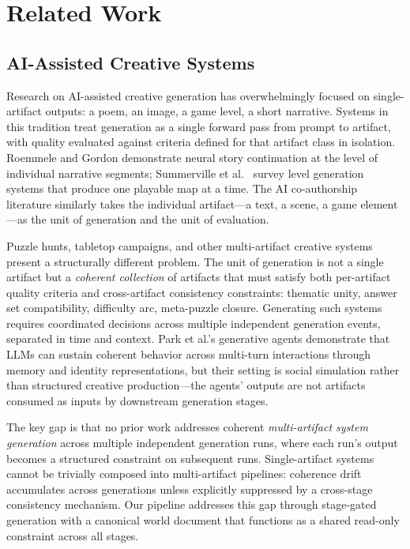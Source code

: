 \section{Related Work}
\label{sec:related}

\subsection{AI-Assisted Creative Systems}

Research on AI-assisted creative generation has overwhelmingly focused on single-artifact
outputs: a poem, an image, a game level, a short narrative. Systems in this tradition treat
generation as a single forward pass from prompt to artifact, with quality evaluated against
criteria defined for that artifact class in isolation. Roemmele and Gordon
\cite{roemmele2015} demonstrate neural story continuation at the level of individual
narrative segments; Summerville et al.\ \cite{summerville2018} survey level generation
systems that produce one playable map at a time. The AI co-authorship literature
\cite{kreminski2020} similarly takes the individual artifact---a text, a scene, a game
element---as the unit of generation and the unit of evaluation.

Puzzle hunts, tabletop campaigns, and other multi-artifact creative systems present a
structurally different problem. The unit of generation is not a single artifact but a
\emph{coherent collection} of artifacts that must satisfy both per-artifact quality criteria
and cross-artifact consistency constraints: thematic unity, answer set compatibility,
difficulty arc, meta-puzzle closure. Generating such systems requires coordinated decisions
across multiple independent generation events, separated in time and context. Park et al.'s
generative agents \cite{park2023generative} demonstrate that LLMs can sustain coherent
behavior across multi-turn interactions through memory and identity representations, but
their setting is social simulation rather than structured creative production---the agents'
outputs are not artifacts consumed as inputs by downstream generation stages.

The key gap is that no prior work addresses coherent \emph{multi-artifact system generation}
across multiple independent generation runs, where each run's output becomes a structured
constraint on subsequent runs. Single-artifact systems cannot be trivially composed into
multi-artifact pipelines: coherence drift accumulates across generations unless explicitly
suppressed by a cross-stage consistency mechanism. Our pipeline addresses this gap through
stage-gated generation with a canonical world document that functions as a shared
read-only constraint across all stages.

